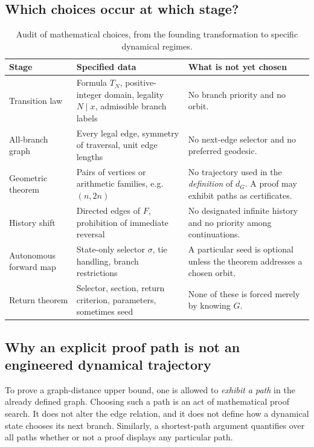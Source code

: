 \documentclass[11pt,a4paper]{article}
\theoremstyle{definition}\newtheorem{definition}[theorem]{Definition}
\begin{document}
\subsection{Which choices occur at which stage?}
\begin{table}[htbp]
\centering\small
\caption{Audit of mathematical choices, from the founding transformation to specific dynamical regimes.}
\label{tab:choices}
\begin{tabularx}{\textwidth}{@{}p{29mm}X X@{}}
\toprule
\textbf{Stage} & \textbf{Specified data} & \textbf{What is not yet chosen}\\
\midrule
Transition law & Formula $T_N$, positive-integer domain, legality $N\mid x$, admissible branch labels & No branch priority and no orbit.\\
All-branch graph & Every legal edge, symmetry of traversal, unit edge lengths & No next-edge selector and no preferred geodesic.\\
Geometric theorem & Pairs of vertices or arithmetic families, e.g. $(n,2n)$ & No trajectory used in the \emph{definition} of $d_G$. A proof may exhibit paths as certificates.\\
History shift & Directed edges of $F$, prohibition of immediate reversal & No designated infinite history and no priority among continuations.\\
Autonomous forward map & State-only selector $\sigma$, tie handling, branch restrictions & A particular seed is optional unless the theorem addresses a chosen orbit.\\
Return theorem & Selector, section, return criterion, parameters, sometimes seed & None of these is forced merely by knowing $G$.\\
\bottomrule
\end{tabularx}
\end{table}

\subsection{Why an explicit proof path is not an engineered dynamical trajectory}
To prove a graph-distance upper bound, one is allowed to \emph{exhibit a path} in the already defined graph. Choosing such a path is an act of mathematical proof search. It does not alter the edge relation, and it does not define how a dynamical state chooses its next branch. Similarly, a shortest-path argument quantifies over all paths whether or not a proof displays any particular path.
\end{document}
